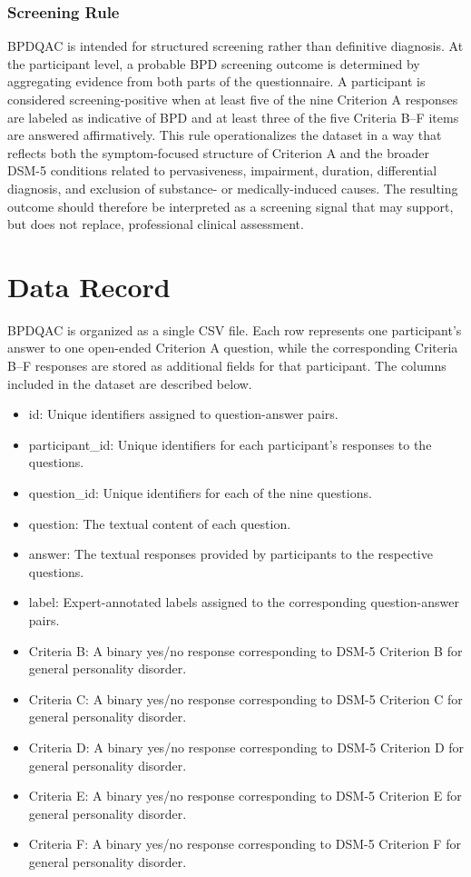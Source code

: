 \documentclass{article}
\begin{document}
\subsubsection{Screening Rule}
BPDQAC is intended for structured screening rather than definitive diagnosis. At the participant level, a probable BPD screening outcome is determined by aggregating evidence from both parts of the questionnaire. A participant is considered screening-positive when at least five of the nine Criterion A responses are labeled as indicative of BPD and at least three of the five Criteria B--F items are answered affirmatively. This rule operationalizes the dataset in a way that reflects both the symptom-focused structure of Criterion A and the broader DSM-5 conditions related to pervasiveness, impairment, duration, differential diagnosis, and exclusion of substance- or medically-induced causes. The resulting outcome should therefore be interpreted as a screening signal that may support, but does not replace, professional clinical assessment.

\section{Data Record}\label{sec4}
BPDQAC is organized as a single CSV file. Each row represents one participant's answer to one open-ended Criterion A question, while the corresponding Criteria B--F responses are stored as additional fields for that participant. The columns included in the dataset are described below.
\begin{itemize}
    \item id: Unique identifiers assigned to question-answer pairs.
    \item participant\_id: Unique identifiers for each participant's responses to the questions.
    \item question\_id: Unique identifiers for each of the nine questions.
    \item question: The textual content of each question.
    \item answer: The textual responses provided by participants to the respective questions.
    \item label: Expert-annotated labels assigned to the corresponding question-answer pairs.
    \item Criteria B: A binary yes/no response corresponding to DSM-5 Criterion B for general personality disorder.
    \item Criteria C: A binary yes/no response corresponding to DSM-5 Criterion C for general personality disorder.
    \item Criteria D: A binary yes/no response corresponding to DSM-5 Criterion D for general personality disorder.
    \item Criteria E: A binary yes/no response corresponding to DSM-5 Criterion E for general personality disorder.
    \item Criteria F: A binary yes/no response corresponding to DSM-5 Criterion F for general personality disorder.
\end{itemize}
\end{document}
